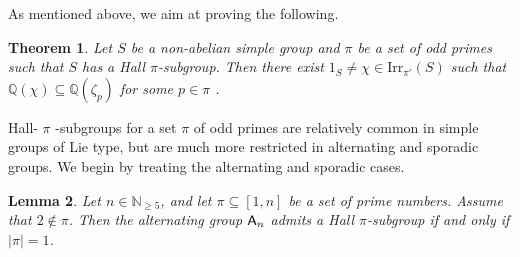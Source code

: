 \documentclass[12pt]{amsart}
\newtheorem{theorem}{Theorem}[section]
\newtheorem{lemma}[theorem]{Lemma}
\theoremstyle{definition}
\numberwithin{equation}{section}
\newcommand{\Irr}{{\mathrm {Irr}}}
\newcommand{\QQ}{{\mathbb Q}}
\newcommand{\Al}{\textup{\textsf{A}}}
\begin{document}
As mentioned above, we aim at %
proving the following.

\begin{theorem}\label{thm:simple}
Let %
$S$ be a non-abelian simple group and $\pi$ be a set of odd
primes such that $S$ has a Hall $\pi$-subgroup. Then %
there exist
$1_S\neq\chi\in\Irr_{\pi'}(S)$ %
such that
$\QQ(\chi)\subseteq\QQ(\zeta_p)$ for some $p\in\pi$%
.
\end{theorem}


Hall- $\pi$%
-subgroups for a set $\pi$ of odd primes are relatively
common in simple groups of Lie type, but are much more restricted in
alternating and sporadic groups. We begin by treating the
alternating and sporadic cases.

\begin{lemma}\label{lem:noHall}
Let $n\in\mathbb{N}_{\geq 5}$, and %
let $\pi\subseteq [1,n]$ be a set
of prime numbers. Assume that $2\notin\pi$. Then the alternating
group $\Al_n$ admits a Hall $\pi$-subgroup if and only if $|\pi|=1$.
\end{lemma}
\end{document}
